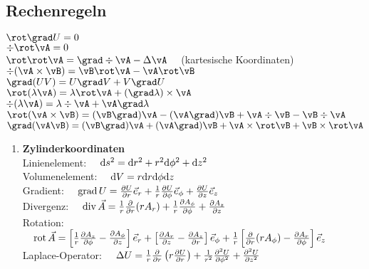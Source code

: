 \documentclass{atistandalonetask}
\begin{document}
\begin{atiTask}[
	title = Formelblatt
]
\subsection{Rechenregeln}
$\rot \grad U = 0$ \\[0.25em]
$\div \rot \vA = 0$ \\[0.25em]
$\rot \rot \vA = \grad \div \vA - \Delta \vA \quad$ (kartesische Koordinaten) \\[0.25em]
$\div( \vA \times \vB ) =  \vB \rot \vA - \vA \rot \vB$ \\[0.25em]
$\grad ( U V) = U \grad V + V \grad U$ \\[0.25em]
$ \rot ( \lambda \vA ) = \lambda \rot \vA + (\grad \lambda ) \times \vA$ \\[0.25em]
$ \div ( \lambda \vA) = \lambda \div \vA + \vA \grad \lambda$ \\[0.25em]
$ \rot ( \vA \times \vB) = (\vB \grad ) \vA - (\vA \grad ) \vB + \vA \div \vB - \vB \div \vA$ \\[0.25em]
$ \grad(\vA \vB) = (\vB \grad ) \vA + (\vA \grad ) \vB + \vA \times \rot \vB + \vB \times \rot \vA$ \\[0.25em]
\clearpage
\begin{enumerate}
  \renewcommand{\labelenumi}{\textbf{\alph{enumi})}}
  \item \textbf{Zylinderkoordinaten}\\[1em]
  Linienelement: $\quad \mathrm{d} s^2 = \mathrm{d} r^2 + r^2 \mathrm{d} \phi^2 + \mathrm{d} z^2$ \\[1em] 
  Volumenelement: $\quad \mathrm{d} V = r \mathrm{d} r \mathrm{d} \phi \mathrm{d} z$ \\[1em]
  Gradient: $\quad \gradient U = \leibnizPartialDerivative{U}{r} \vec{e}_r + \frac{1}{r} \leibnizPartialDerivative{U}{\phi} \vec{e}_\phi + \leibnizPartialDerivative{U}{z} \vec{e}_z$ \\[1em] 
  Divergenz: $\quad \divergence \vec{A} = \frac{1}{r} \leibnizPartialDerivative{}{r} (rA_r) + \frac{1}{r} \leibnizPartialDerivative{A_\phi}{\phi} + \leibnizPartialDerivative{A_z}{z}$ \\[1em]
  Rotation: $\quad \curl \vec{A} = \left[ \frac{1}{r} \leibnizPartialDerivative{A_z}{\phi} - \leibnizPartialDerivative{A_\phi}{z} \right] \vec{e}_r + \left[ \leibnizPartialDerivative{A_r}{z} - \leibnizPartialDerivative{A_z}{r} \right] \vec{e}_\phi + \frac{1}{r} \left[ \leibnizPartialDerivative{}{r} (rA_\phi) - \leibnizPartialDerivative{A_r}{\phi} \right] \vec{e}_z$ \\[1em]
  Laplace-Operator: $\quad \Delta U = \frac{1}{r} \leibnizPartialDerivative{}{r} \left( r \leibnizPartialDerivative{U}{r} \right) + \frac{1}{r^2} \leibnizPartialDerivative[2]{U}{\phi} + \leibnizPartialDerivative[2]{U}{z}$ 

\end{enumerate}
\end{atiTask}
\end{document}
